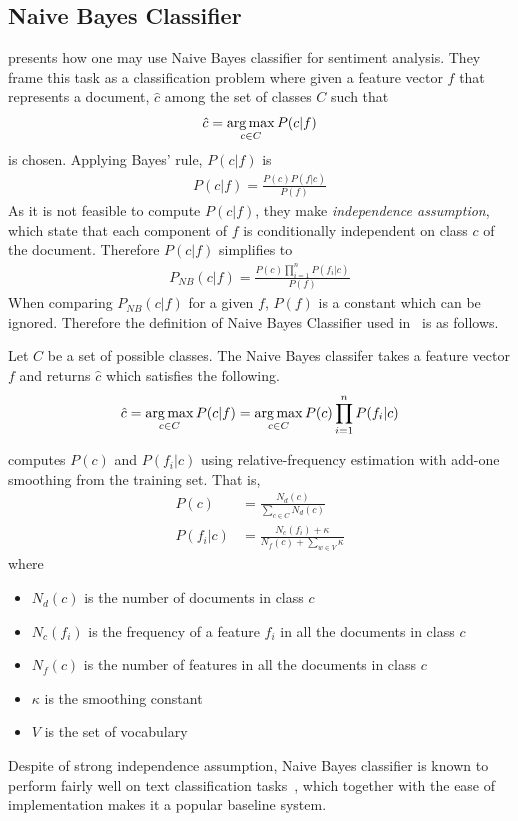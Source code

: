 \subsection{Naive Bayes Classifier}
\cite{pang2002thumbs} presents how one may use Naive Bayes classifier for sentiment analysis. They frame this task as a classification problem where given a feature vector $f$ that represents a document, $\hat{c}$ among the set of classes $C$ such that
\begin{align*}
\hat{c} = \operatorname*{arg\,max}_{c \in C}P(c|f)
\end{align*}
is chosen.
 Applying Bayes' rule, $P(c|f)$ is
\begin{align*}
P(c|f) = \frac{P(c)P(f|c)}{P(f)}
\end{align*}
As it is not feasible to compute $P(c|f)$, they make {\em independence assumption}, which state that each component of $f$ is conditionally independent on class $c$ of the document.
Therefore $P(c|f)$ simplifies to
\begin{align*}
P_{NB}(c|f) = \frac{P(c)\prod_{i=1}^{n}P(f_i|c)}{P(f)}
\end{align*}
When comparing $P_{NB}(c|f)$ for a given $f$, $P(f)$ is a constant which can be ignored. Therefore the definition of Naive Bayes Classifier used in~\citep{pang2002thumbs} is as follows.
\begin{definition}
\label{def:2}
Let $C$ be a set of possible classes. The Naive Bayes classifer takes a feature vector $f$ and returns $\hat{c}$ which satisfies the following.
\begin{align*}
\hat{c} = \operatorname*{arg\,max}_{c \in C}P(c|f) = \operatorname*{arg\,max}_{c \in C}P(c)\prod_{i=1}^{n}P(f_i|c)
\end{align*}
\end{definition}
\cite{pang2002thumbs} computes $P(c)$ and $P(f_i|c)$ using relative-frequency estimation with add-one smoothing from the training set. That is,
\begin{align*}
P(c) &= \frac{N_d(c)}{\sum\limits_{c \in C}^{}N_d(c)}\\
P(f_i|c) &= \frac{N_c(f_i)+\kappa }{N_f(c) + \sum\limits_{w \in V} \kappa}
\end{align*}
where 
\begin{itemize}
\item $N_d(c)$ is the number of documents in class $c$
\item $N_c(f_i)$ is the frequency of a feature $f_i$ in all the documents in class $c$
\item $N_f(c)$ is the number of features in all the documents in class $c$
\item $\kappa$ is the smoothing constant
\item $V$ is the set of vocabulary
\end{itemize}
Despite of strong independence assumption, Naive Bayes classifier is known to perform fairly well on text classification tasks~\citep{mccallum1998comparison}, which together with the ease of implementation makes it a popular baseline system.